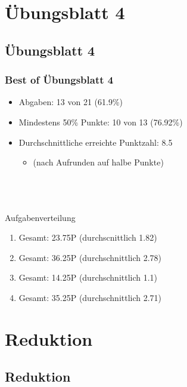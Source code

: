 




\section{Übungsblatt 4}
\subsection{Übungsblatt 4}

\begin{frame}
\frametitle{Best of Übungsblatt 4}
\begin{itemize}
	\item Abgaben: 13 von 21 (61.9\%)
	\item Mindestens 50\% Punkte: 10 von 13 (76.92\%)
	\item Durchschnittliche erreichte Punktzahl: 8.5
	\begin{itemize}
		\item (nach Aufrunden auf halbe Punkte)
	\end{itemize}
\end{itemize}~\\~\\~\\
Aufgabenverteilung
\begin{enumerate}[{A}ufg{a}be 1:]
	\item Gesamt: 23.75P (durchscnittlich 1.82)
	\item Gesamt: 36.25P (durchschnittlich 2.78)
	\item Gesamt: 14.25P (durchschnittlich 1.1)
	\item Gesamt: 35.25P (durchschnittlich 2.71)
\end{enumerate}
\end{frame}

\section{Reduktion}
\subsection{Reduktion}


